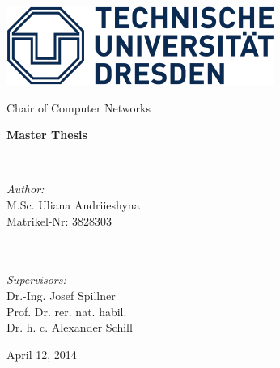 \begin{titlepage}

\begin{center}

\begin{minipage}{0.30\textwidth}
	\begin{flushleft}
			\includegraphics[scale=0.45]{images/tud_logo}
	\end{flushleft}
\end{minipage}

\begin{bfseries}
	\large Chair of Computer Networks
\end{bfseries}

\vspace*{75mm}

{\LARGE \bf Master Thesis}\\[1 cm]

\begin{minipage}{0.8\textwidth}
	\begin{center}

		\\[3cm]
	\end{center}
\end{minipage}

\vspace{30mm}

\begin{minipage}{0.35\textwidth}
	\begin{flushleft} \large
		\emph{Author:}\\
		M.Sc. Uliana Andriieshyna\\
		Matrikel-Nr: 3828303\\
		~\\ ~\\
	\end{flushleft}
\end{minipage}
\begin{minipage}{0.60\textwidth}
	\begin{flushright} \large
		\emph{Supervisors:} \\
		Dr.-Ing. Josef Spillner\\
		Prof. Dr. rer. nat. habil.\\ Dr. h. c. Alexander Schill\\
		\end{flushright}
\end{minipage}

\vfill

April 12, 2014

\end{center}
\end{titlepage}
